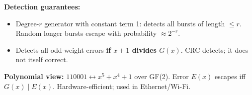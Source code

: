 \documentclass[a4paper,landscape,10pt]{article}
\newcommand{\term}[1]{{\bfseries #1}}
\begin{document}
{\begin{minipage}[t]{\dimexpr(\textwidth-9mm)/3\relax}
    \term{Detection guarantees:}
    \begin{itemize}
      \item Degree-\(r\) generator with constant term 1: detects all bursts
        of length \(\le r\). Random longer bursts escape with probability
        \(\approx2^{-r}\).
      \item Detects all odd-weight errors \term{if \(x+1\) divides \(G(x)\)}.
        CRC detects; it does not itself correct.
    \end{itemize}
    \term{Polynomial view:} \(110001\leftrightarrow x^5+x^4+1\) over GF(2).
    Error \(E(x)\) escapes iff \(G(x)\mid E(x)\).
    Hardware-efficient; used in Ethernet/Wi-Fi.

\end{minipage}}

\end{document}
